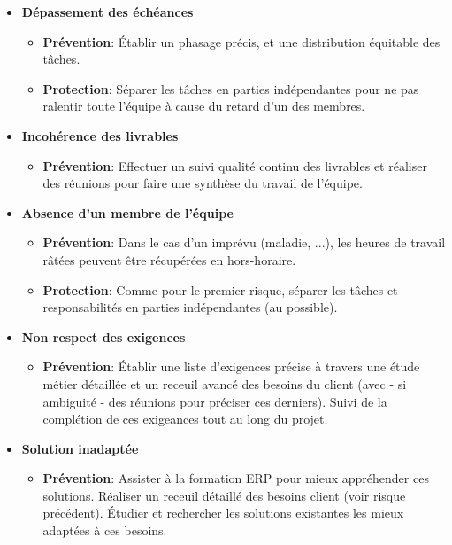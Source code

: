 \begin{itemize}

  \item \textbf{Dépassement des échéances}
        \begin{itemize}
          \item \textbf{Prévention}: Établir un phasage précis, et une distribution équitable des tâches.
          \item \textbf{Protection}: Séparer les tâches en parties indépendantes pour ne pas ralentir toute l'équipe à cause du retard d'un des membres.
        \end{itemize}

  \item \textbf{Incohérence des livrables}
        \begin{itemize}
          \item \textbf{Prévention}: Effectuer un suivi qualité continu des livrables et réaliser des réunions pour faire une synthèse du travail de l'équipe.
        \end{itemize}

  \item \textbf{Absence d'un membre de l'équipe}
        \begin{itemize}
          \item \textbf{Prévention}: Dans le cas d'un imprévu (maladie, ...), les heures de travail râtées peuvent être récupérées en hors-horaire.
          \item \textbf{Protection}: Comme pour le premier risque, séparer les tâches et responsabilités en parties indépendantes (au possible).
        \end{itemize}


  \item \textbf{Non respect des exigences}
        \begin{itemize}
          \item \textbf{Prévention}: Établir une liste d'exigences précise à travers une étude métier détaillée et un receuil avancé des besoins du client (avec - si ambiguité - des réunions pour préciser ces derniers). Suivi de la complétion de ces exigeances tout au long du projet.
        \end{itemize}


  \item \textbf{Solution inadaptée}
        \begin{itemize}
          \item \textbf{Prévention}:  Assister à la formation ERP pour mieux appréhender ces solutions. Réaliser un receuil détaillé des besoins client (voir risque précédent). Étudier et rechercher les solutions existantes les mieux adaptées à ces besoins.
        \end{itemize}



\end{itemize}

